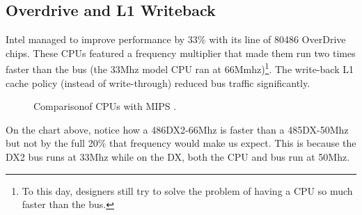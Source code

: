 \subsection{Overdrive and L1 Writeback}
Intel managed to improve performance by 33\% with its line of 80486 OverDrive chips. These CPUs featured a frequency multiplier that made them run two times faster than the bus (the 33Mhz model CPU ran at 66Mmhz)\footnote{To this day, designers still try to solve the problem of having a CPU so much faster than the bus.}.  The write-back L1 cache policy (instead of write-through) reduced bus traffic significantly.\\
\par 
\vspace{10pt}
\par

\begin{figure}[H]
\centering
   \caption{Comparison\protect\footnotemark of CPUs with MIPS \protect\footnotemark.}
 \end{figure}
\par
On the chart above, notice how a 486DX2-66Mhz is faster than a 485DX-50Mhz but not by the full 20\% that frequency would make us expect. This is because the DX2 bus runs at 33Mhz while on the DX, both the CPU and bus run at 50Mhz.




